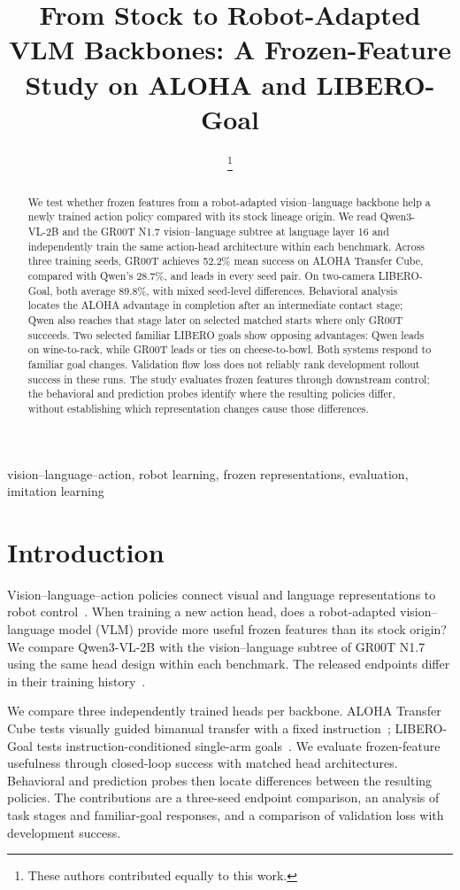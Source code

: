 \documentclass[conference]{IEEEtran}
\title{From Stock to Robot-Adapted VLM Backbones: A Frozen-Feature Study on ALOHA and LIBERO-Goal}
\author{\IEEEauthorblockN{Sittipon Kumda\IEEEauthorrefmark{1} and Rachata Pratheep Na Thalang\IEEEauthorrefmark{1}}\IEEEauthorblockA{King Mongkut's Institute of Technology Ladkrabang\\Thailand\\sittiponkumda@gmail.com, pratheepg49@gmail.com}\thanks{\IEEEauthorrefmark{1}These authors contributed equally to this work.}}
\newcommand{\groot}{GR00T N1.7}
\newcommand{\qwen}{Qwen3-VL-2B}
\begin{document}
\raggedbottom
\maketitle
\begin{abstract}
We test whether frozen features from a robot-adapted vision--language
backbone help a newly trained action policy compared with its stock lineage
origin. We read Qwen3-VL-2B and the GR00T N1.7 vision--language subtree at
language layer 16 and independently train the same action-head architecture
within each benchmark. Across three training seeds, GR00T achieves 52.2\%
mean success on ALOHA Transfer Cube, compared with Qwen's 28.7\%, and leads
in every seed pair. On two-camera LIBERO-Goal, both average 89.8\%, with
mixed seed-level differences. Behavioral analysis locates the ALOHA advantage
in completion after an intermediate contact stage; Qwen also reaches that
stage later on selected matched starts where only GR00T succeeds. Two
selected familiar LIBERO goals show opposing advantages: Qwen leads on
wine-to-rack, while GR00T leads or ties on cheese-to-bowl. Both systems
respond to familiar goal changes. Validation flow loss does not reliably
rank development rollout success in these runs. The study evaluates frozen
features through downstream control; the behavioral and prediction probes
identify where the resulting policies differ, without establishing which
representation changes cause those differences.
\end{abstract}
\begin{IEEEkeywords}
vision--language--action, robot learning, frozen representations, evaluation,
imitation learning
\end{IEEEkeywords}

\section{Introduction}
Vision--language--action policies connect visual and language representations
to robot control~\cite{openvla,pi0,grootn1}. When training a new action head,
does a robot-adapted vision--language model (VLM) provide more useful frozen
features than its stock origin? We compare \qwen{} with the vision--language
subtree of \groot{} using the same head design within each benchmark. The released endpoints differ in their training history~\cite{groot17}.

We compare three independently trained heads per backbone. ALOHA Transfer
Cube tests visually guided bimanual transfer with a fixed instruction~\cite{aloha};
LIBERO-Goal tests instruction-conditioned single-arm goals~\cite{libero}.
We evaluate frozen-feature usefulness through closed-loop success with
matched head architectures. Behavioral and prediction probes then locate
differences between the resulting policies. The contributions are a
three-seed endpoint comparison, an analysis of task stages and familiar-goal
responses, and a comparison of validation loss with development success.
\end{document}
